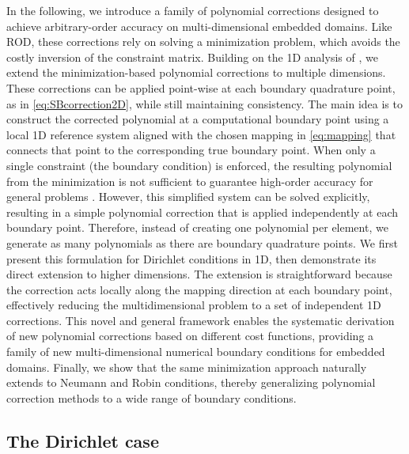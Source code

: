 \documentclass{article}
\begin{document}
In the following, we introduce a family of polynomial corrections designed to achieve arbitrary-order accuracy on multi-dimensional embedded domains. Like ROD, these corrections rely on solving a minimization problem, which avoids the costly inversion of the constraint matrix. Building on the 1D analysis of \cite{ciallella2025minimization}, we extend the minimization-based polynomial corrections to multiple dimensions. These corrections can be applied point-wise at each boundary quadrature point, as in \eqref{eq:SBcorrection2D}, while still maintaining consistency. The main idea is to construct the corrected polynomial at a computational boundary point using a local 1D reference system aligned with the chosen mapping in \eqref{eq:mapping} that connects that point to the corresponding true boundary point. When only a single constraint (the boundary condition) is enforced, the resulting polynomial from the minimization is not sufficient to guarantee high-order accuracy for general problems \cite{santos2024very}. However, this simplified system can be solved explicitly, resulting in a simple polynomial correction that is applied independently at each boundary point. Therefore, instead of creating one polynomial per element, we generate as many polynomials as there are boundary quadrature points. We first present this formulation for Dirichlet conditions in 1D, then demonstrate its direct extension to higher dimensions. The extension is straightforward because the correction acts locally along the mapping direction at each boundary point, effectively reducing the multidimensional problem to a set of independent 1D corrections. This novel and general framework enables the systematic derivation of new polynomial corrections based on different cost functions, providing a family of new multi-dimensional numerical boundary conditions for embedded domains. Finally, we show that the same minimization approach naturally extends to Neumann and Robin conditions, thereby generalizing polynomial correction methods to a wide range of boundary conditions.

\subsection{The Dirichlet case}
\end{document}
